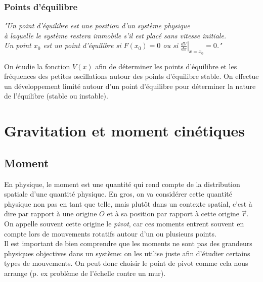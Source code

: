 \documentclass{article}
\numberwithin{equation}{section}
\begin{document}
\subsubsection{Points d'équilibre}
\begin{center}
	\emph{"Un point d'équilibre est une position d'un système physique \\ à laquelle le système restera immobile s'il est placé sans vitesse initiale. \\ Un point \(x_0\) est un point d'équilibre si \(F(x_0) = 0\) ou si \(\left . \frac{dV}{dx} \right \rvert_{x=x_0} = 0\)."} %
\end{center}
On étudie la fonction \(V(x)\) afin de déterminer les points d'équilibre et les fréquences des petites oscillations autour des points d'équilibre stable. On effectue un développement limité autour d'un point d'équilibre pour déterminer la nature de l'équilibre (stable ou instable).

\section{Gravitation et moment cinétiques}

\subsection{Moment}
En physique, le moment est une quantité qui rend compte de la distribution spatiale d'une quantité physique. En gros, on va considérer cette quantité physique non pas en tant que telle, mais plutôt dans un contexte spatial, c'est à dire par rapport à une origine \(O\) et à sa position par rapport à cette origine \(\vec r\). On appelle souvent cette origine le \emph{pivot}, car ces moments entrent souvent en compte lors de mouvements rotatifs autour d'un ou plusieurs points. \\ Il est important de bien comprendre que les moments ne sont pas des grandeurs physiques objectives dans un système: on les utilise juste afin d'étudier certains types de mouvements. On peut donc choisir le point de pivot comme cela nous arrange (p. ex problème de l'échelle contre un mur). \\
\end{document}
